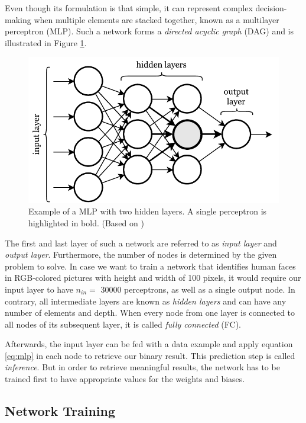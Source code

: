Even though its formulation is that simple, it can represent complex decision-making when multiple elements are stacked together, known as a multilayer perceptron (MLP). Such a network forms a \textit{directed acyclic graph} (DAG) and is illustrated in Figure \ref{fig:mlp}.

\begin{figure}[htpb]
	\centering
	\includegraphics[width=.75\linewidth]{figures/mlp.pdf}
	\caption[Multilayer Perceptron]{Example of a MLP with two hidden layers. A single perceptron is highlighted in bold. (Based on \parencite{neural_nets_deep_learning})} \label{fig:mlp}
\end{figure}

The first and last layer of such a network are referred to as \textit{input layer} and \textit{output layer}. Furthermore, the number of nodes is determined by the given problem to solve. In case we want to train a network that identifies human faces in RGB-colored pictures with height and width of 100 pixels, it would require our input layer to have $ n_{in}=$ \num{30000} perceptrons, as well as a single output node. In contrary, all intermediate layers are known as \textit{hidden layers} and can have any number of elements and depth. When every node from one layer is connected to all nodes of its subsequent layer, it is called \textit{fully connected} (FC).

Afterwards, the input layer can be fed with a data example and apply equation \ref{eq:mlp} in each node to retrieve our binary result. This prediction step is called \textit{inference}. But in order to retrieve meaningful results, the network has to be trained first to have appropriate values for the weights and biases.

\subsection{Network Training}

